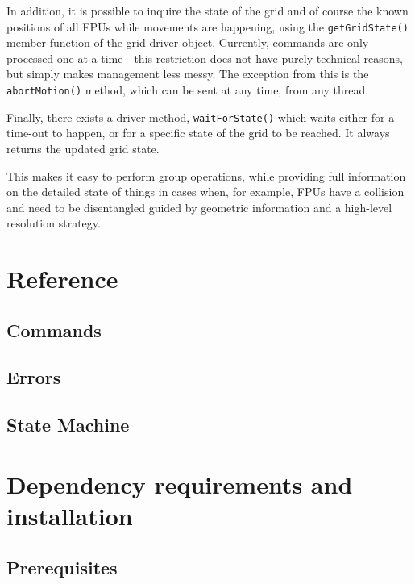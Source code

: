 \documentclass{scrartcl}[12pt,a4paper]
\begin{document}
In addition, it is possible to inquire the state of the grid and of
course the known positions of all FPUs while movements are happening,
using the \texttt{getGridState()} member function of the grid driver
object. Currently, commands are only processed one at a time - this
restriction does not have purely technical reasons, but simply makes
management less messy. The exception from this is the
\texttt{abortMotion()} method, which can be sent at any time, from any
thread.

Finally, there exists a driver method, \texttt{waitForState()} which
waits either for a time-out to happen, or for a specific state of the
grid to be reached. It always returns the updated grid state.

This makes it easy to perform group operations, while providing full
information on the detailed state of things in cases when, for
example, FPUs have a collision and need to be disentangled guided by
geometric information and a high-level resolution strategy.



\section{Reference}
\subsection{Commands}
\subsection{Errors}
\subsection{State Machine}

\appendix

\section{Dependency requirements and installation}



\subsection{Prerequisites}
\end{document}
